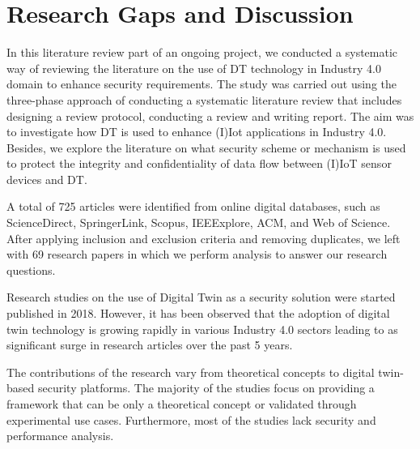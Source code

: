 
\section{Research Gaps and Discussion}


In this literature review part of an ongoing project, we conducted a systematic way of reviewing the literature on the use of DT technology in Industry 4.0 domain to enhance security requirements. The study was carried out using the three-phase approach of conducting a systematic literature review that includes designing a review protocol, conducting a review and writing report. The aim was to investigate how DT is used to enhance (I)Iot applications in Industry 4.0. Besides, we explore the literature on what security scheme or mechanism is used to protect the integrity and confidentiality of data flow between (I)IoT sensor devices and DT.



A total of 725 articles were identified from online digital databases, such as ScienceDirect, SpringerLink, Scopus, IEEExplore, ACM, and Web of Science. After applying inclusion and exclusion criteria and removing duplicates, we left with 69 research papers in which we perform analysis to answer our research questions.

Research studies on the use of Digital Twin as a security solution were started published in 2018. However, it has been observed that the adoption of digital twin technology is growing rapidly in various Industry 4.0 sectors leading to as significant surge in research articles over the past 5 years. 

The contributions of the research vary from theoretical concepts to digital twin-based security platforms. The majority of the studies focus on providing a framework that can be only a theoretical concept or validated through experimental use cases. Furthermore, most of the studies lack security and performance analysis.

